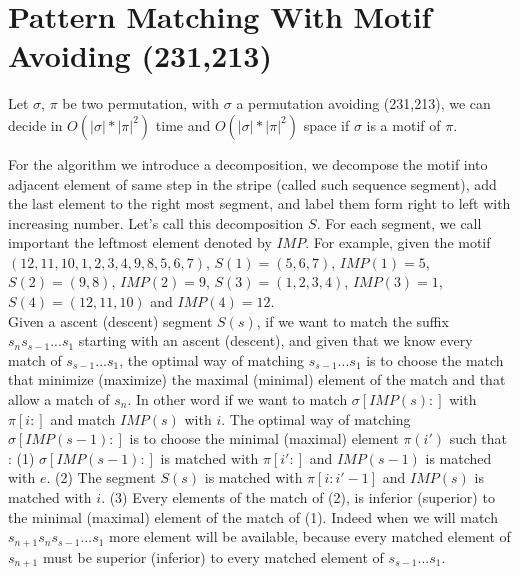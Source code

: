 \documentclass[a4paper]{llncs}
\newcommand{\ptext}{\pi}
\newcommand{\pmotif}{\sigma}
\newcounter{num}
\begin{document}
		
		\section{Pattern Matching With Motif Avoiding (231,213)}	

			\begin{proposition}
			Let $\pmotif$, $\ptext$ 
			be two permutation,
			with  $\pmotif$ a permutation avoiding (231,213), 
			we can decide in $O(|\pmotif|*|\ptext|^2)$ time
			and $O(|\pmotif|*|\ptext|^2)$ space
			if $\pmotif$ 
			is a motif of $\ptext$.
			\end{proposition}

			
			
			For the algorithm we introduce a decomposition,
			we decompose the motif into
			adjacent element of same step in the stripe 
			(called such sequence segment),
			add the last element to the right most segment,
			and label them form right to left
			with increasing number.
			Let's call this decomposition $S$.
			For each segment, we call important 
			the leftmost element denoted by $IMP$.
			For example, given the motif $(12,11,10,1,2,3,4,9,8,5,6,7)$,
			$S(1)=(5,6,7)$, $IMP(1)=5$, 
			$S(2)=(9,8)$, $IMP(2)=9$, 
			$S(3)=(1,2,3,4)$, $IMP(3)=1$, 
			$S(4)=(12,11,10)$ and $IMP(4)=12$.\\
			
			Given a ascent (descent) segment $S(s)$,
			if we want to
			match the suffix $s_ns_{s-1}...s_1$
			starting with an ascent (descent),
			and given that we know every
			match of $s_{s-1}...s_1$,
			the optimal way of matching
			$s_{s-1}...s_1$
			is to choose the match
			that minimize (maximize)
			the maximal (minimal)
			element of the match
			and that allow a match
			of $s_n$.			
			In other word if we want to match 
			$\pmotif[IMP(s):]$
			with $\ptext[i:]$
			and match $IMP(s)$
			with $i$.
			The optimal way
			of matching
			$\pmotif[IMP(s-1):]$
			is to choose the
			minimal (maximal) element $\ptext(i')$
			such that :
			(1) $\pmotif[IMP(s-1):]$ is matched with $\ptext[i':]$
			and $IMP(s-1)$ is matched with $e$.
			(2) The segment $S(s)$ is matched with $\ptext[i:i'-1]$
			and $IMP(s)$ is matched with $i$.
			(3) Every elements of the match of (2),
			is inferior (superior) to the minimal (maximal) element of the match of (1).
			Indeed when we will 
			match $s_{n+1}s_ns_{s-1}...s_1$
			more element will be available,
			because every matched 
			element of $s_{n+1}$
			must be superior (inferior)
			to every matched element
			of $s_{s-1}...s_1$.\\
			  
\end{document}
